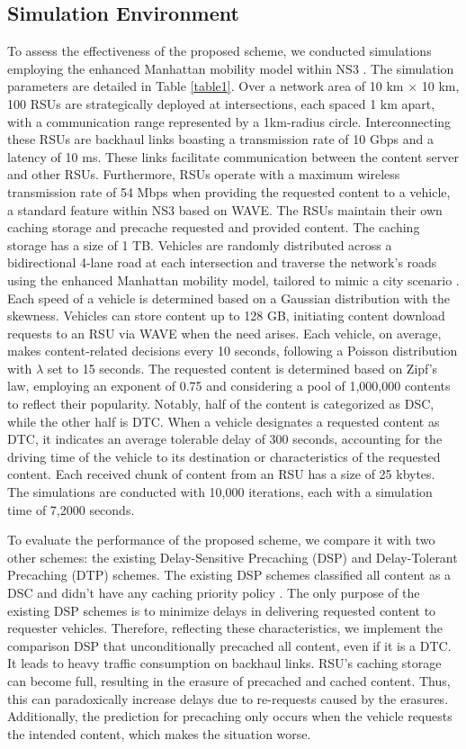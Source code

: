\documentclass[journal]{IEEEtran}
\begin{document}
\subsection{Simulation Environment} \label{sec.s1}
To assess the effectiveness of the proposed scheme, we conducted simulations employing the enhanced Manhattan mobility model within NS3 \cite{NS3}.
The simulation parameters are detailed in Table \ref{table1}.
Over a network area of 10 km $\times$ 10 km, 100 RSUs are strategically deployed at intersections, each spaced 1 km apart, with a communication range represented by a 1km-radius circle.
Interconnecting these RSUs are backhaul links boasting a transmission rate of 10 Gbps and a latency of 10 ms.
These links facilitate communication between the content server and other RSUs.
Furthermore, RSUs operate with a maximum wireless transmission rate of 54 Mbps when providing the requested content to a vehicle, a standard feature within NS3 based on WAVE.
The RSUs maintain their own caching storage and precache requested and provided content.
The caching storage has a size of 1 TB.
Vehicles are randomly distributed across a bidirectional 4-lane road at each intersection and traverse the network's roads using the enhanced Manhattan mobility model, tailored to mimic a city scenario \cite{Manhattan}.
Each speed of a vehicle is determined based on a Gaussian distribution with the skewness.
Vehicles can store content up to 128 GB, initiating content download requests to an RSU via WAVE when the need arises.
Each vehicle, on average, makes content-related decisions every 10 seconds, following a Poisson distribution with $\lambda$ set to 15 seconds.
The requested content is determined based on Zipf's law, employing an exponent of 0.75 and considering a pool of 1,000,000 contents to reflect their popularity.
Notably, half of the content is categorized as DSC, while the other half is DTC.
When a vehicle designates a requested content as DTC, it indicates an average tolerable delay of 300 seconds, accounting for the driving time of the vehicle to its destination or characteristics of the requested content.
Each received chunk of content from an RSU has a size of 25 kbytes.
The simulations are conducted with 10,000 iterations, each with a simulation time of 7,2000 seconds.

To evaluate the performance of the proposed scheme, we compare it with two other schemes: the existing Delay-Sensitive Precaching (DSP) and Delay-Tolerant Precaching (DTP) schemes.
The existing DSP schemes classified all content as a DSC \cite{Zhe2020} and didn't have any caching priority policy \cite{Ikram2021}.
The only purpose of the existing DSP schemes is to minimize delays in delivering requested content to requester vehicles.
Therefore, reflecting these characteristics, we implement the comparison DSP that unconditionally precached all content, even if it is a DTC.
It leads to heavy traffic consumption on backhaul links.
RSU's caching storage can become full, resulting in the erasure of precached and cached content.
Thus, this can paradoxically increase delays due to re-requests caused by the erasures.
Additionally, the prediction for precaching only occurs when the vehicle requests the intended content, which makes the situation worse.
\end{document}

